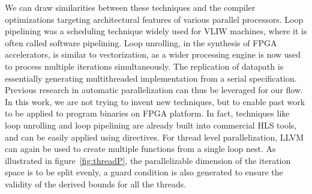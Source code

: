 We can draw similarities between these techniques and the compiler optimizations targeting architectural features
of various parallel processors. Loop pipelining was a scheduling technique
widely used for VLIW machines, where it is often called software pipelining. Loop unrolling, in the synthesis of FPGA
accelerators, is similar to vectorization, as a wider processing engine
is now used to process multiple iterations simultaneously. The replication of
datapath is essentially generating multithreaded implementation from a serial
specification. Previous research in automatic parallelization can thus be
leveraged for our flow. In this work, we are not trying to invent new techniques, but to enable past work to be applied to program binaries on FPGA
platform. In fact, techniques like loop unrolling and loop pipelining are already built
into commercial HLS tools, and can be easily applied using directives. For thread level parallelization, LLVM can again be used to create multiple functions from a single loop nest. As illustrated in figure~\ref{fig:threadP}, the parallelizable dimension of the iteration space
is to be split evenly, a guard condition is also generated to ensure the validity 
of the derived bounds for all the threads.



